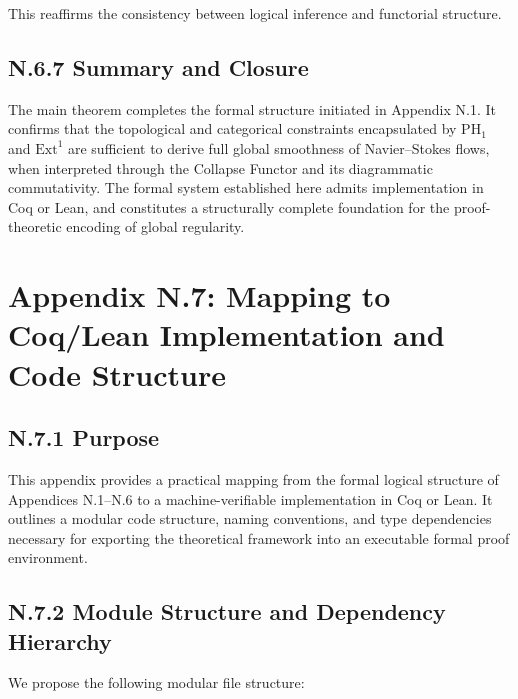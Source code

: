 \documentclass[11pt]{article}
\begin{document}
This reaffirms the consistency between logical inference and functorial structure.

\subsection*{N.6.7 Summary and Closure}

The main theorem completes the formal structure initiated in Appendix N.1.  
It confirms that the topological and categorical constraints encapsulated by $\mathrm{PH}_1$ and $\mathrm{Ext}^1$  
are sufficient to derive full global smoothness of Navier–Stokes flows, when interpreted through  
the Collapse Functor and its diagrammatic commutativity. The formal system established here  
admits implementation in Coq or Lean, and constitutes a structurally complete foundation  
for the proof-theoretic encoding of global regularity.




\section*{Appendix N.7: Mapping to Coq/Lean Implementation and Code Structure}

\subsection*{N.7.1 Purpose}

This appendix provides a practical mapping from the formal logical structure of Appendices N.1–N.6  
to a machine-verifiable implementation in Coq or Lean. It outlines a modular code structure, naming conventions,  
and type dependencies necessary for exporting the theoretical framework into an executable formal proof environment.

\subsection*{N.7.2 Module Structure and Dependency Hierarchy}

We propose the following modular file structure:
\end{document}
